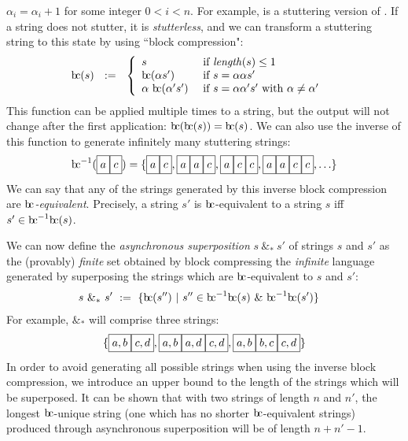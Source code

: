 \documentclass[a4paper,11pt,leqno]{article}
\newcommand{\bc}{{\rm b\!c}}
\newcommand{\vph}[1]{\vphantom{#1}}
\newcommand{\ebox}[1]{\fbox{$\vph{',}#1$}}
\newcommand{\eboxl}[1]{\fbox{$\vph{'}#1$}}
\begin{document}
$\alpha_i=\alpha_i+1$ for some integer $0 < i < n$. For example, 
\eboxl{a}\eboxl{a}\eboxl{a}\eboxl{c}\eboxl{c}
 is a stuttering version of 
\eboxl{a}\eboxl{c}. If 
a string does not 
stutter, it is \textit{stutterless}, and we can transform a stuttering string 
to this 
state by using ``block compression":
\begin{align}
\bc(s)  &\ \ :=\ \
\left\{ \begin{array}{ll}
s & \mbox{ if \textit{length}}(s)\leq 1 \\
\bc({\alpha}s')  & \mbox{ if } s={\alpha}{\alpha}s'\\
\alpha ~{\bc}({\alpha'}{s'})  
& \mbox{ if } s=\alpha{\alpha'}{s'} \mbox{ with } \alpha\neq\alpha'
\end{array}
\right. 
\end{align}
This function can be applied multiple times to a string, but the output will 
not change after the first application: $\bc(\bc(s)) = \bc(s)$. We can also use 
the inverse of this function to generate infinitely many stuttering strings:
\begin{align}
\bc^{-1}(\ebox{a}\ebox{c}) = 
\{ \ebox{a}\ebox{c},
\ebox{a}\ebox{a}\ebox{c},
\ebox{a}\ebox{c}\ebox{c}, 
\ebox{a}\ebox{a}\ebox{c}\ebox{c}, 
\ldots \}
\end{align}
We can say that any of the strings generated by this inverse block compression 
are \textit{$\bc{}$-equivalent}. Precisely, a string $s'$ is $\bc{}$-equivalent 
to a 
string 
$s$ iff $s' \in \bc^{-1}\bc(s)$.

We can now define the \textit{asynchronous superposition} $s~\&_*~s'$ of 
strings $s$ and 
$s'$ as the (provably) \textit{finite} set obtained by block compressing the 
\textit{infinite} 
language generated by superposing the strings which are $\bc$-equivalent to $s$ 
and $s'$:
\begin{align}
s\ \&_* \ s' & \ := \
\{\bc(s'') \ | \ s''\in \bc^{-1}\bc(s)\ \& \ \bc^{-1}\bc(s')\}
\end{align}
For example, \ebox{a}\ebox{c} $\&_*$ 
\ebox{b}\ebox{d} will comprise 
three strings:
\begin{align}
\{ \ebox{a, b}\ebox{c, d},
\ebox{a, b}\ebox{a, d}\ebox{c, d},
\ebox{a, b}\ebox{b, c}\ebox{c, d} \}
\end{align}
In order to avoid generating all possible strings when using the inverse block 
compression, we introduce an upper bound to the length of the strings which 
will be superposed. It can be shown that with two strings of length $n$ and 
$n'$, the longest $\bc$-unique string (one which has no shorter 
$\bc$-equivalent strings) produced through asynchronous superposition will be 
of length $n+n'-1$.
\end{document}
